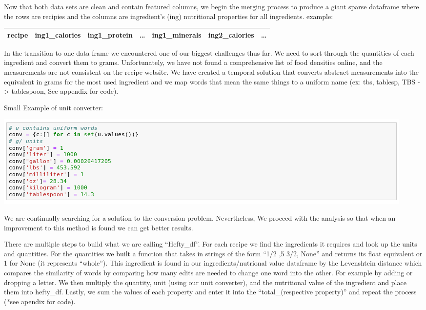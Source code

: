\documentclass[11pt]{article}
\makeatletter
\def\maxwidth{\ifdim\Gin@nat@width>\linewidth\linewidth
    \else\Gin@nat@width\fi}
\let\Oldincludegraphics\includegraphics
\renewcommand{\includegraphics}[1]{\Oldincludegraphics[width=.8\maxwidth]{#1}}
\makeatother
\begin{document}
    Now that both data sets are clean and contain featured columns, we begin
the merging process to produce a giant sparse dataframe where the rows
are recipies and the columns are ingredient's (ing) nutritional
properties for all ingredients. example:

\begin{longtable}[]{@{}lllllll@{}}
\toprule
recipe & ing1\_calories & ing1\_protein & \ldots{} & ing1\_minerals &
ing2\_calories & \ldots{}\tabularnewline
\midrule
\endhead
\bottomrule
\end{longtable}

In the transition to one data frame we encountered one of our biggest
challenges thus far. We need to sort through the quantities of each
ingredient and convert them to grams. Unfortunately, we have not found a
comprehensive list of food densities online, and the measurements are
not consistent on the recipe website. We have created a temporal
solution that converts abstract measurements into the equivalent in
grams for the most used ingredient and we map words that mean the same
things to a uniform name (ex: tbs, tablesp, TBS -\textgreater{}
tablespoon, See appendix for code).

Small Example of unit converter:

\includegraphics{isaac_code5.png}

    We are continually searching for a solution to the conversion problem.
Nevertheless, We proceed with the analysis so that when an improvement
to this method is found we can get better results.

There are multiple steps to build what we are calling ``Hefty\_df''. For
each recipe we find the ingredients it requires and look up the units
and quantities. For the quantities we built a function that takes in
strings of the form ``1/2 ,5 3/2, None'' and returns its float
equivalent or 1 for None (it represents ``whole''). This ingredient is
found in our ingredients/nutrional value dataframe by the Levenshtein
distance which compares the similarity of words by comparing how many
edits are needed to change one word into the other. For example by
adding or dropping a letter. We then multiply the quantity, unit (using
our unit converter), and the nutritional value of the ingredient and
place them into hefty\_df. Lastly, we sum the values of each property
and enter it into the ``total\_(respective property)'' and repeat the
process (*see apendix for code).
\end{document}
